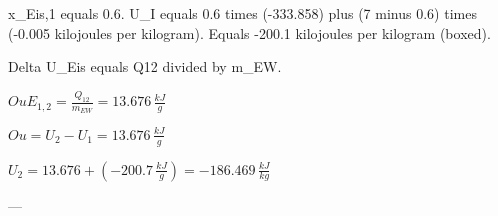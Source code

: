 x_Eis,1 equals 0.6.  
U_I equals 0.6 times (-333.858) plus (7 minus 0.6) times (-0.005 kilojoules per kilogram).  
Equals -200.1 kilojoules per kilogram (boxed).  

Delta U_Eis equals Q12 divided by m_EW.

\( Ou E_{1,2} = \frac{Q_{12}}{m_{EW}} = 13.676 \, \frac{kJ}{g} \)  

\( Ou = U_2 - U_1 = 13.676 \, \frac{kJ}{g} \)  

\( U_2 = 13.676 + (-200.7 \, \frac{kJ}{g}) = -186.469 \, \frac{kJ}{kg} \)  

---